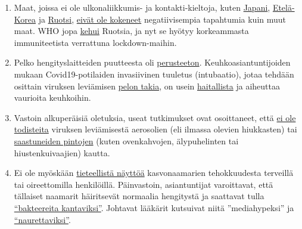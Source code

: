 \begin{enumerate}
{  lockdownia}.
\item
  Maat, joissa ei ole ulkonaliikkumis- ja kontakti-kieltoja, kuten
  \href{https://www.japantimes.co.jp/news/2020/03/20/national/coronavirus-explosion-expected-japan/}{Japani},
  \href{https://www.businessinsider.com/south-korea-coronavirus-testing-death-rate-2020-3?op=1\&r=US\&IR=T}{Etelä-Korea}
  ja \href{https://www.youtube.com/watch?v=bfN2JWifLCY}{Ruotsi},
  \href{https://www.washingtontimes.com/news/2020/apr/15/sweden-coronavirus-rates-easing-despite-loose-rule/}{eivät
  ole kokeneet} negatiivisempia tapahtumia kuin muut maat. WHO jopa
  \href{https://nypost.com/2020/04/29/who-lauds-sweden-as-model-for-resisting-coronavirus-lockdown/}{kehui}
  Ruotsia, ja nyt se hyötyy korkeammasta immuniteetista verrattuna
  lockdown-maihin.
\item
  Pelko hengityslaitteiden puutteesta oli
  \href{https://apnews.com/8ccd325c2be9bf454c2128dcb7bd616d}{perusteeton}.
  Keuhkoasiantuntijoiden mukaan Covid19-potilaiden invasiivinen tuuletus
  (intubaatio), jotaa tehdään osittain viruksen leviämisen
  \href{https://www.dailymail.co.uk/news/article-8262351/Nurse-New-York-claims-city-killing-COVID-19-patients-putting-ventilators.html}{pelon
  takia}, on usein
  \href{https://www.medscape.com/viewarticle/928156}{haitallista} ja
  aiheuttaa vaurioita keuhkoihin.
\item
  Vastoin alkuperäisiä oletuksia, useat tutkimukset ovat osoittaneet,
  että
  \href{https://www.who.int/news-room/commentaries/detail/modes-of-transmission-of-virus-causing-covid-19-implications-for-ipc-precaution-recommendations}{ei
  ole todisteita} viruksen leviämisestä aerosolien (eli ilmassa olevien
  hiukkasten) tai
  \href{https://www.telegraph.co.uk/news/2020/04/02/no-proof-coronavirus-can-spread-shopping-says-leading-german/}{saastuneiden
  pintojen} (kuten ovenkahvojen, älypuhelinten tai hiustenkuivaajien)
  kautta.
\item
  Ei ole myöskään
  \href{https://www.researchgate.net/publication/340570735_Masks_Don't_Work_A_review_of_science_relevant_to_COVID-19_social_policy}{tieteellistä
  näyttöä} kasvonaamarien tehokkuudesta terveillä tai oireettomilla
  henkilöillä. Päinvastoin, asiantuntijat varoittavat, että tällaiset
  naamarit häiritsevät normaalia hengitystä ja saattavat tulla
  \href{https://de.sputniknews.com/interviews/20200425326953541-corona-gefahr-virologe/}{``bakteereita
  kantaviksi''}. Johtavat lääkärit kutsuivat niitä ''mediahypeksi'' ja
  \href{https://www.aerztezeitung.de/Politik/Montgomery-haelt-Maskenpflicht-fuer-falsch-408844.html}{``naurettaviksi''}.

\end{enumerate}
